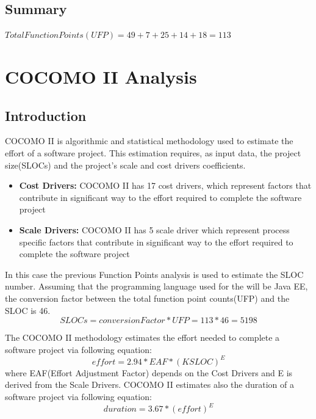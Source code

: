 \documentclass[11pt,titlepage]{article} %
\begin{document}
     \subsection{Summary}
	\begin{center}
	$ Total Function Points(UFP) = 49 + 7 + 25 + 14 + 18  = 113 $
	\end{center}

\newpage
\section{COCOMO II Analysis}
  \subsection{Introduction}
    COCOMO II is algorithmic and statistical methodology used to estimate the effort of a software project.
    This estimation requires, as input data, the project size(SLOCs) and the project's scale and cost drivers coefficients.\newline
    
    \begin{itemize}
     \item \textbf{Cost Drivers:} COCOMO II has 17 cost drivers, which represent factors that contribute in significant way to the effort required to complete the software project
     \item \textbf{Scale Drivers:} COCOMO II has 5 scale driver which represent process specific factors that contribute in significant way to the effort required to complete the software project
    \end{itemize}
    
    In this case the previous Function Points analysis is used to estimate the SLOC number.\newline
    Assuming that the programming language used for the will be Java EE, the conversion factor between the 
    total function point counts(UFP) and the SLOC is 46.
    \begin{equation}
     SLOCs = conversionFactor * UFP = 113 * 46 = 5198
    \end{equation}

    The COCOMO II methodology estimates the effort needed to complete a software project via following equation:
    \begin{equation}
     effort = 2.94 * EAF * (KSLOC)^E
    \end{equation}
    where EAF(Effort Adjustment Factor) depends on the Cost Drivers and E is derived from the Scale Drivers.\newline
    COCOMO II estimates also the duration of a software project via following equation:
    \begin{equation}
     duration = 3.67 * (effort)^E
    \end{equation}
  \newpage
\end{document}

